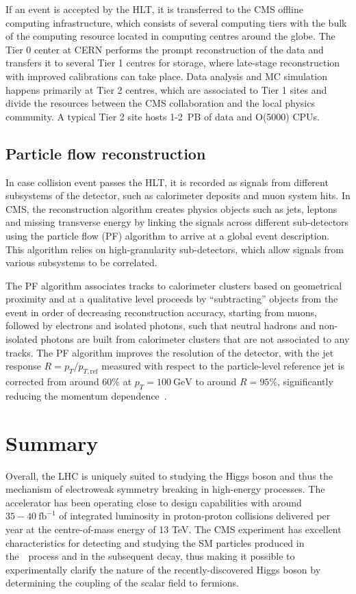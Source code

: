 If an event is accepted by the HLT, it is transferred to the CMS offline computing infrastructure, which consists of several computing tiers with the bulk of the computing resource located in computing centres around the globe. The Tier 0 center at CERN performs the prompt reconstruction of the data and transfers it to several Tier 1 centres for storage, where late-stage reconstruction with improved calibrations can take place. Data analysis and MC simulation happens primarily at Tier 2 centres, which are associated to Tier 1 sites and divide the resources between the CMS collaboration and the local physics community. A typical Tier 2 site hosts 1-2~PB of data and O(5000) CPUs.

\subsection{Particle flow reconstruction}
In case collision event passes the HLT, it is recorded as signals from different subsystems of the detector, such as calorimeter deposits and muon system hits. In CMS, the reconstruction algorithm creates physics objects such as jets, leptons and missing transverse energy by linking the signals across different sub-detectors using the particle flow (PF) algorithm to arrive at a global event description. This algorithm relies on high-granularity sub-detectors, which allow signals from various subsystems to be correlated. 

The PF algorithm associates tracks to calorimeter clusters based on geometrical proximity and at a qualitative level proceeds by ``subtracting'' objects from the event in order of decreasing reconstruction accuracy, starting from muons, followed by electrons and isolated photons, such that neutral hadrons and non-isolated photons are built from calorimeter clusters that are not associated to any tracks. The PF algorithm improves the resolution of the detector, with the jet response $R = p_T / p_{T,\mathrm{ref}}$ measured with respect to the particle-level reference jet is corrected from around 60\% at $p_T = 100~\mathrm{GeV}$ to around $R=95\%$, significantly reducing the momentum dependence~\cite{cms_particleflow:2017}.

\section{Summary}
Overall, the LHC is uniquely suited to studying the Higgs boson and thus the mechanism of electroweak symmetry breaking in high-energy processes. The accelerator has been operating close to design capabilities with around $35-40~\mathrm{fb}^{-1}$ of integrated luminosity in proton-proton collisions delivered per year at the centre-of-mass energy of 13 TeV. The CMS experiment has excellent characteristics for detecting and studying the SM particles produced in the~\ttH~process and in the subsequent decay, thus making it possible to experimentally clarify the nature of the recently-discovered Higgs boson by determining the coupling of the scalar field to fermions.

